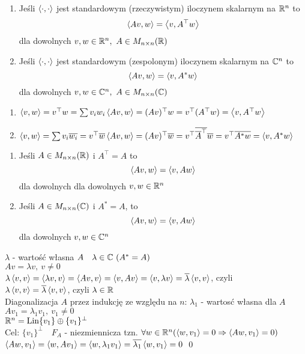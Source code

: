 \begin{ft} \hfill
  \begin{enumerate}[(1)]
    \item Jeśli $\left\langle \cdot, \cdot \right\rangle$ jest standardowym (rzeczywistym) iloczynem
    skalarnym na $\mathbb{R}^n$ to \[ \left\langle Av, w \right\rangle = \left\langle v, A^\top w \right\rangle \] dla dowolnych $v, w
    \in \mathbb{R}^n,\ A \in M_{n \times n}(\mathbb{R})$
    \item Jeśli $\left\langle \cdot, \cdot \right\rangle$ jest standardowym (zespolonym) iloczynem
    skalarnym na $\mathbb{C}^n$ to \[ \left\langle Av, w \right\rangle = \left\langle v, A^*w \right\rangle \] dla dowolnych $v,w \in
    \mathbb{C}^n,\ A \in M_{n \times n}(\mathbb{C})$
  \end{enumerate}
\end{ft}
\begin{dd} \hfill
  \begin{enumerate}[(1)]
    \item $\left\langle v, w \right\rangle = v^\top w = \sum v_i w_i \\
           \left\langle Av, w \right\rangle = (Av)^\top w = v^\top (A^\top w) = \left\langle v, A^\top w \right\rangle$
    \item $\left\langle v, w \right\rangle = \sum v_i \overline{w_i} = v^\top \overline w \\
           \left\langle Av, w \right\rangle = (Av)^\top \overline w =
           v^\top \overline{\overline{A}^\top} \overline w =
           v^\top \overline{A^* w} = \left\langle v, A^* w \right\rangle$
  \end{enumerate}
\end{dd}

\begin{wn} \hfill
  \begin{enumerate}[(1)]
    \item  Jeśli $A \in M_{n \times n}(\mathbb{R})$ i $A^\top = A$ to
    \[ \left\langle Av, w \right\rangle = \left\langle v, Aw \right\rangle\] dla dowolnych dla dowolnych $v,w \in \mathbb{R}^n$
    \item Jeśli $A \in M_{n \times n}(\mathbb{C})$ i $A^* = A$, to
    \[ \left\langle Av, w \right\rangle = \left\langle v, Aw \right\rangle\] dla dowolnych $v,w \in \mathbb{C}^n$
  \end{enumerate}
\end{wn}

\begin{dd}[tw. Spektralnego]
  $\lambda$ - wartość własna $A \quad \lambda \in \CC \ (A^* = A)$ \\
  $Av = \lambda v,\ v \neq 0$ \\
  $\lambda \left\langle v, v \right\rangle = \left\langle \lambda v, v \right\rangle = \left\langle Av, v \right\rangle = \left\langle v, Av \right\rangle =
  \left\langle v, \lambda v \right\rangle = \overline \lambda \left\langle v, v \right\rangle$, czyli \\
  $\lambda \left\langle v, v \right\rangle = \overline \lambda \left\langle v, v \right\rangle$, czyli $\lambda \in \mathbb{R}$ \\
  Diagonalizacja $A$ przez indukcję ze względu na $n$:
  $\lambda_1$ - wartosć własna dla $A$ \\
  $Av_1 = \lambda_1 v_1,\ v_1 \neq 0$ \\
  $\mathbb{R}^n = \operatorname{Lin}\{v_1\} \oplus \{v_1\}^\bot$ \\
  Cel: $\{v_1\}^\bot \quad F_A$ - niezmiennicza tzn.
  $\forall w \in \mathbb{R}^n (\left\langle w, v_1 \right\rangle = 0 \Rightarrow \left\langle Aw, v_1 \right\rangle = 0)$ \\
  $\left\langle Aw, v_1 \right\rangle = \left\langle w, Av_1 \right\rangle = \left\langle w, \lambda_1 v_1 \right\rangle = \overline{\lambda_1}
  \left\langle w, v_1 \right\rangle = 0$ \hfill \qed
\end{dd}

